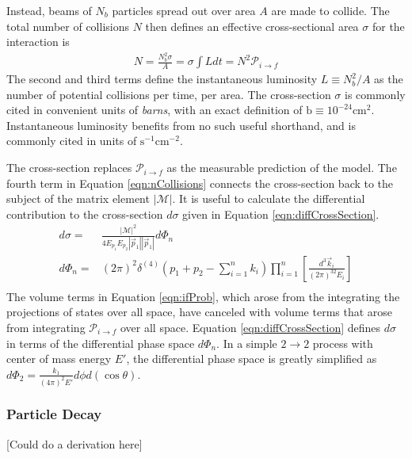 Instead, beams of $N_b$ particles spread out over area $A$ are made to collide.
The total number of collisions $N$ then defines an effective cross-sectional area $\sigma$ for the interaction is
\begin{equation}\begin{split}\label{eqn:nCollisions}
    N=\frac{N_b^2\sigma}{A}=\sigma\int Ldt=N^2\mathcal{P}_{i\to f}
\end{split}\end{equation} 
The second and third terms define the instantaneous luminosity $L\equiv N_b^2/A$ as the number of potential collisions per time, per area.
The cross-section $\sigma$ is commonly cited in convenient units of \emph{barns}, with an exact definition of $\text{b}\equiv10^{-24}\text{cm}^2$.
Instantaneous luminosity benefits from no such useful shorthand, and is commonly cited in units of $\text{s}^{-1}\text{cm}^{-2}$.

The cross-section replaces $\mathcal{P}_{i\to f}$ as the measurable prediction of the model.
The fourth term in Equation \ref{eqn:nCollisions} connects the cross-section back to the subject of the matrix element $|\mathcal{M}|$.
It is useful to calculate the differential contribution to the cross-section $d\sigma$ given in Equation \ref{eqn:diffCrossSection}.
\begin{equation}\begin{split}\label{eqn:diffCrossSection}
d\sigma=&\frac{|\mathcal{M}|^2}{4E_{p_1}E_{p_2}|\vec{p}_1||\vec{p}_1|}d\Phi_n \\
d\Phi_n=&(2\pi)^2\delta^{(4)}\left(p_1+p_2-\sum^n_{i=1}k_i\right)\prod^n_{i=1}\left[\frac{d^3\vec{k}_i}{(2\pi)^32E_i}\right] \\
\end{split}\end{equation} 
The volume terms in Equation \ref{eqn:ifProb}, which arose from the integrating the projections of states over all space, have canceled with volume terms that arose from integrating $\mathcal{P}_{i\to f}$ over all space.
Equation \ref{eqn:diffCrossSection} defines $d\sigma$ in terms of the differential phase space $d\Phi_n$. 
In a simple $2\to2$ process with center of mass energy $E'$, the differential phase space is greatly simplified as $d\Phi_2=\frac{k_1}{(4\pi)^2E'}d\phi d(\cos\theta)$.

\subsubsection{Particle Decay}
{\color{red} [Could do a derivation here]}


